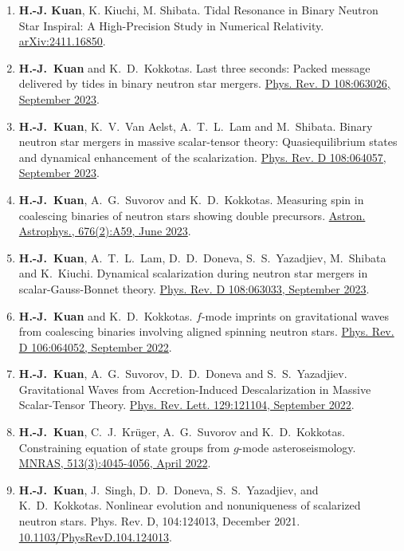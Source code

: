 \documentclass[10pt,floatfix,a4paper]{article}
\begin{document}
\begin{enumerate}
	\item \textbf{H.-J. Kuan}, K. Kiuchi, M. Shibata. Tidal Resonance in Binary Neutron Star Inspiral: A High-Precision Study in Numerical Relativity. \href{https://arxiv.org/abs/2411.16850}{arXiv:2411.16850}.
	\item \textbf{H.-J.~Kuan} and K.~D.~Kokkotas. Last three seconds: Packed message delivered by tides in binary neutron star mergers. \href{https://journals.aps.org/prd/abstract/10.1103/PhysRevD.108.063026}{Phys. Rev. D 108:063026, September 2023}. 
	\item \textbf{H.-J.~Kuan}, K.~V.~Van Aelst, A.~T.~L.~Lam and M.~Shibata. Binary neutron star mergers in massive scalar-tensor theory: Quasiequilibrium states and dynamical enhancement of the scalarization. \href{https://journals.aps.org/prd/abstract/10.1103/PhysRevD.108.064057}{Phys. Rev. D 108:064057, September 2023}.
	\item \textbf{H.-J.~Kuan}, A.~G.~Suvorov and K.~D.~Kokkotas. Measuring spin in coalescing binaries of neutron stars showing double precursors. \href{	https://doi.org/10.1051/0004-6361/202346658}{Astron. Astrophys., 676(2):A59, June 2023}.
	\item \textbf{H.-J.~Kuan}, A.~T.~L.~Lam, D.~D.~Doneva, S.~S.~Yazadjiev, M.~Shibata and K.~Kiuchi. Dynamical scalarization during neutron star mergers in scalar-Gauss-Bonnet theory. \href{https://journals.aps.org/prd/abstract/10.1103/PhysRevD.108.063033}{Phys. Rev. D 108:063033, September 2023}.
	\item \textbf{H.-J.~Kuan} and K.~D.~Kokkotas. $f$-mode imprints on gravitational waves from coalescing binaries involving aligned spinning neutron stars. \href{https://journals.aps.org/prd/abstract/10.1103/PhysRevD.106.064052}{Phys. Rev. D 106:064052, September 2022}.
	\item \textbf{H.-J.~Kuan}, A.~G.~Suvorov, D.~D.~Doneva and S.~S.~Yazadjiev. Gravitational Waves from Accretion-Induced Descalarization in Massive Scalar-Tensor Theory. \href{https://journals.aps.org/prl/abstract/10.1103/PhysRevLett.129.121104}{Phys. Rev. Lett. 129:121104, September 2022}.
	\item \textbf{H.-J.~Kuan}, C.~J.~Kr{\"u}ger, A.~G.~Suvorov and K.~D.~Kokkotas. Constraining equation of state groups from $g$-mode asteroseismology. \href{https://doi.org/10.1093/mnras/stac1101}{MNRAS, 513(3):4045-4056, April 2022}.
	\item \textbf{H.-J.~Kuan}, J.~Singh, D.~D.~Doneva, S.~S.~Yazadjiev, and K.~D.~Kokkotas. Nonlinear evolution and nonuniqueness of scalarized neutron stars. Phys. Rev. D, 104:124013, December 2021. \href{https://doi.org/10.1103/PhysRevD.104.124013}{10.1103/PhysRevD.104.124013}.

\end{enumerate}
\end{document}
